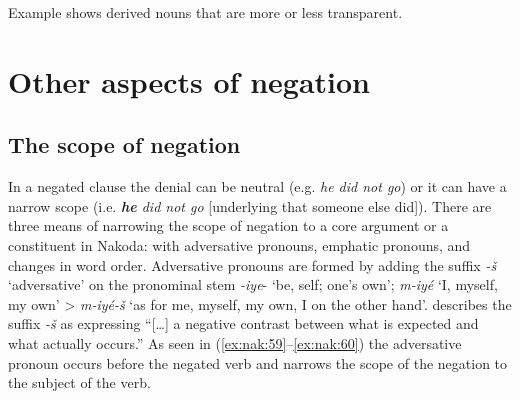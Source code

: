 \documentclass[output=paper,colorlinks,citecolor=brown]{langscibook}
\begin{document}
Example  shows derived nouns that are more or less transparent.


\section{Other aspects of negation}\label{sec:nak:4}
\subsection{The scope of negation}\label{sec:nak:4.1}

In a negated clause the denial can be neutral (e.g. \textit{he did not go}) or it can have a narrow scope (i.e. \textit{\textbf{he} did not go} [underlying that someone else did]). There are three means of narrowing the scope of negation to a core argument or a constituent in Nakoda: with adversative pronouns, emphatic pronouns, and changes in word order. Adversative pronouns are formed by adding the suffix \textit{-š} ‘adversative’ on the pronominal stem \textit{-iye}- ‘be, self; one’s own’; \textit{m-iyé} ‘I, myself, my own’ > \textit{m-iyé-š} ‘as for me, myself, my own, I on the other hand’. \citet[173--174]{Cumberland2005} describes the suffix \textit{-š} as expressing “[…] a negative contrast between what is expected and what actually occurs.” As seen in (\ref{ex:nak:59}--\ref{ex:nak:60}) the adversative pronoun occurs before the negated verb and narrows the scope of the negation to the subject of the verb.
\end{document}
